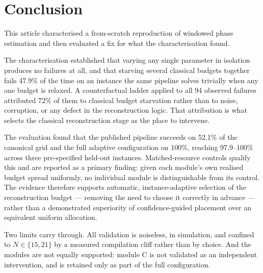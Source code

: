 \section{Conclusion}
\label{sec:conclusion}

This article characterised a from-scratch reproduction of windowed phase
estimation and then evaluated a fix for what the characterisation found.

The characterisation established that varying any single parameter in
isolation produces no failures at all, and that starving several classical
budgets together fails 47.9\% of the time on an instance the same pipeline
solves trivially when any one budget is relaxed. A counterfactual ladder
applied to all 94 observed failures attributed 72\% of them to classical
budget starvation rather than to noise, corruption, or any defect in the
reconstruction logic. That attribution is what selects the classical
reconstruction stage as the place to intervene.

The evaluation found that the published pipeline succeeds on 52.1\% of the
canonical grid and the full adaptive configuration on 100\%, reaching
97.9--100\% across three pre-specified held-out instances. Matched-resource
controls qualify this and are reported as a primary finding: given each
module's own realised budget spread uniformly, no individual module is
distinguishable from its control. The evidence therefore supports automatic,
instance-adaptive selection of the reconstruction budget --- removing the need
to choose it correctly in advance --- rather than a demonstrated superiority
of confidence-guided placement over an equivalent uniform allocation.

Two limits carry through. All validation is noiseless, in simulation, and
confined to $N\in\{15,21\}$ by a measured compilation cliff rather than by
choice. And the modules are not equally supported: module C is not validated
as an independent intervention, and is retained only as part of the full
configuration.
